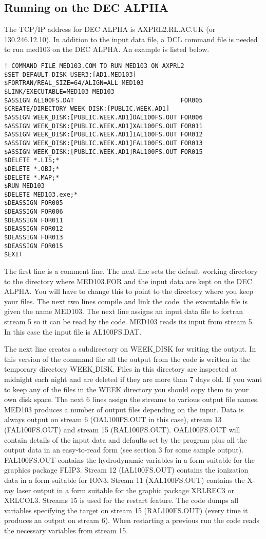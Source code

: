 \subsection{Running on the DEC ALPHA}
The TCP/IP address for DEC ALPHA is AXPRL2.RL.AC.UK (or 130.246.12.10). In addition to the input
data file,
a DCL command file is needed to run med103
on  the DEC ALPHA. An example   is listed below. 

\begin{verbatim}
! COMMAND FILE MED103.COM TO RUN MED103 ON AXPRL2
$SET DEFAULT DISK_USER3:[AD1.MED103]
$FORTRAN/REAL_SIZE=64/ALIGN=ALL MED103
$LINK/EXECUTABLE=MED103 MED103
$ASSIGN AL100FS.DAT                             FOR005
$CREATE/DIRECTORY WEEK_DISK:[PUBLIC.WEEK.AD1]
$ASSIGN WEEK_DISK:[PUBLIC.WEEK.AD1]OAL100FS.OUT FOR006
$ASSIGN WEEK_DISK:[PUBLIC.WEEK.AD1]XAL100FS.OUT FOR011
$ASSIGN WEEK_DISK:[PUBLIC.WEEK.AD1]IAL100FS.OUT FOR012
$ASSIGN WEEK_DISK:[PUBLIC.WEEK.AD1]FAL100FS.OUT FOR013
$ASSIGN WEEK_DISK:[PUBLIC.WEEK.AD1]RAL100FS.OUT FOR015
$DELETE *.LIS;*
$DELETE *.OBJ;*
$DELETE *.MAP;*
$RUN MED103
$DELETE MED103.exe;*
$DEASSIGN FOR005
$DEASSIGN FOR006
$DEASSIGN FOR011
$DEASSIGN FOR012
$DEASSIGN FOR013
$DEASSIGN FOR015
$EXIT
\end{verbatim}

The first line is a comment line. The next line 
sets the default working directory to the directory where
MED103.FOR and the input data are kept on the DEC ALPHA. You will have to change 
this to point to the directory where you keep your files.
The next two lines compile and link 
the code. the executable file is given the name  MED103.
The next line assigns an input data file  to fortran stream 5
so it can be read by the code.
MED103 reads its input from stream 5. In
this case the input file is AL100FS.DAT.

The next line creates a subdirectory on WEEK$\_$DISK for writing the output.
In this version of the command file all the output from the code is 
written in the temporary directory WEEK$\_$DISK. Files in this directory are inspected at
midnight each night and are deleted if they are more than 7 days old.
If you want to keep any of the files 
in the WEEK directory you should copy them to your own disk space.
The next 6 lines assign the streams to various
output file names. 
MED103 produces a number of output
files depending on the input. Data is always output
on stream 6 (OAL100FS.OUT in this case), stream 13
(FAL100FS.OUT) and stream 15 (RAL100FS.OUT). 
OAL100FS.OUT will contain
details of the input data and defaults
set by the program plus all the output data in an easy-to-read form
(see section 3 for some sample output).
FAL100FS.OUT contains the hydrodynamic
variables in a form suitable for the graphics package FLIP3.
Stream 12 (IAL100FS.OUT)
contains the ionization data in a form suitable for ION3.
Stream 11 (XAL100FS.OUT) contains the X-ray laser output in a
form suitable for the graphic package XRLREC3 or XRLCOL3.
Streams 15 is used for the restart feature.
The code dumps all variables specifying the target on stream 15 (RAL100FS.OUT) (every time
it produces an output on stream 6). 
When restarting a previous run the code reads the necessary variables from stream 15. 

